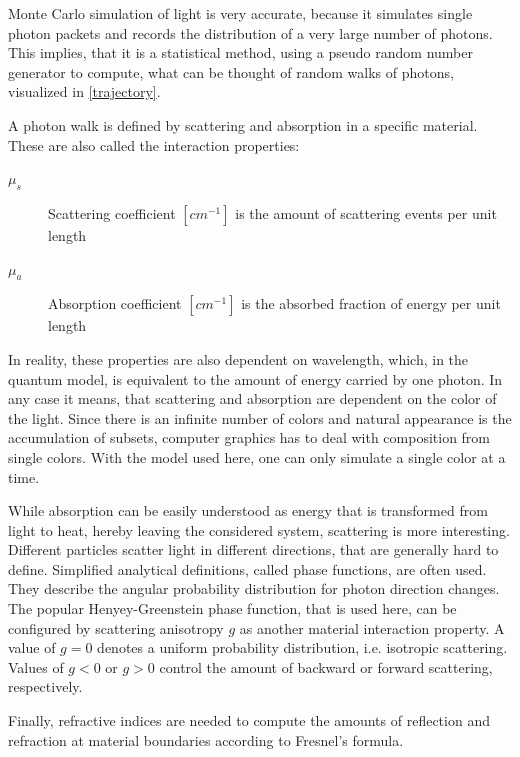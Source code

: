 \documentclass[]{article}
\begin{document}
Monte Carlo simulation of light is very accurate, because it simulates single photon packets and records the distribution of a very large number of photons. This implies, that it is a statistical method, using a pseudo random number generator to compute, what can be thought of random walks of photons, visualized in \autoref{trajectory}.

A photon walk is defined by scattering and absorption in a specific material. These are also called the interaction properties:

\begin{description}
	\item[$\mu_s$] Scattering coefficient $[cm^{-1}]$ is the amount of scattering events per unit length
	\item[$\mu_a$] Absorption coefficient $[cm^{-1}]$ is the absorbed fraction of energy per unit length
\end{description}

In reality, these properties are also dependent on wavelength, which, in the quantum model, is equivalent to the amount of energy carried by one photon. In any case it means, that scattering and absorption are dependent on the color of the light. Since there is an infinite number of colors and natural appearance is the accumulation of subsets, computer graphics has to deal with composition from single colors. With the model used here, one can only simulate a single color at a time.

While absorption can be easily understood as energy that is transformed from light to heat, hereby leaving the considered system, scattering is more interesting. Different particles scatter light in different directions, that are generally hard to define. Simplified analytical definitions, called phase functions, are often used. They describe the angular probability distribution for photon direction changes. The popular Henyey-Greenstein phase function, that is used here, can be configured by scattering anisotropy $g$ as another material interaction property. A value of $g=0$ denotes a uniform probability distribution, i.e. isotropic scattering. Values of $g<0$ or $g>0$ control the amount of backward or forward scattering, respectively.

Finally, refractive indices are needed to compute the amounts of reflection and refraction at material boundaries according to Fresnel's formula.
\end{document}
